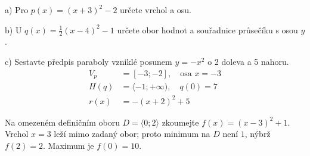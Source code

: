 \documentclass[11pt,a4paper]{article}
\begin{document}
\begin{zadaniReseniBox}[title={Samostatná práce 1}]
a) Pro $p(x)=(x+3)^2-2$ určete vrchol a osu.\par
b) U $q(x)=\tfrac12(x-4)^2-1$ určete obor hodnot a souřadnice průsečíku s osou $y$.\par
c) Sestavte předpis paraboly vzniklé posunem $y=-x^2$ o 2 doleva a 5 nahoru.
\tcblower
\[
\begin{aligned}
V_p&=[-3;-2],\quad \text{osa }x=-3 \\
H(q)&=\langle-1;+\infty),\quad q(0)=7 \\
r(x)&=-(x+2)^2+5
\end{aligned}
\]

\end{zadaniReseniBox}
Na omezeném definičním oboru $D=\langle0;2\rangle$ zkoumejte $f(x)=(x-3)^2+1$. Vrchol $x=3$ leží mimo zadaný obor; proto minimum na $D$ není $1$, nýbrž $f(2)=2$. Maximum je $f(0)=10$.
\end{document}
